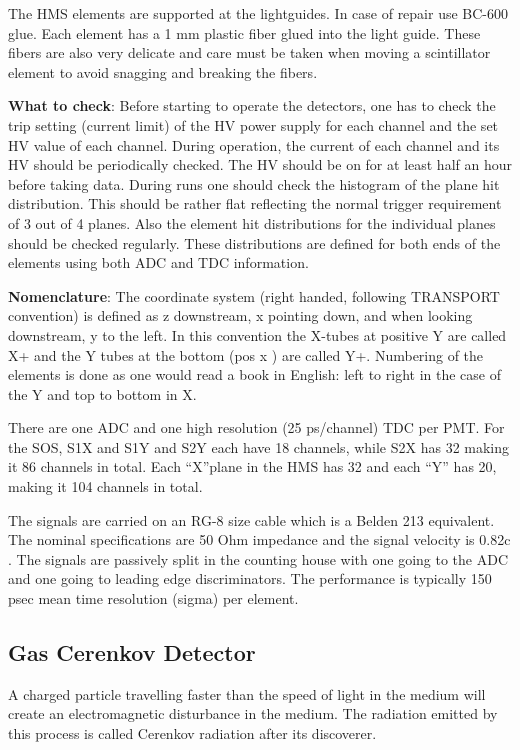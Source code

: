 {The HMS elements are supported at the lightguides. In case of repair use BC-600
glue. Each element has a 1 mm plastic fiber glued into the light guide. These
fibers are also very delicate and care must be taken when moving a scintillator
element to avoid snagging and breaking the fibers.

{\bf What to check}: Before starting to operate the detectors, one has to
check the trip setting (current limit) of the HV power supply for each channel
and the set HV value of each channel. During operation, the current of each
channel and its HV should be periodically checked. The HV should be on for at
least half an hour before taking data. During runs one should check the
histogram of the plane hit distribution. This should be rather flat reflecting
the normal trigger requirement of 3 out of 4 planes. Also the element hit
distributions for the individual planes should be checked regularly. These
distributions are defined for both ends of the elements using both ADC and TDC
information.

{\bf Nomenclature}:
The coordinate system (right handed, following TRANSPORT
convention) is defined as z downstream, x pointing down, and when looking
downstream, y to the left. In this convention the X-tubes at positive Y are
called X+ and the Y tubes at the bottom (pos x ) are called Y+. Numbering of
the elements is done as one would read a book in English: left to right in the
case of the Y and top to bottom in X.

	There are one ADC and one high resolution (25 ps/channel) TDC per PMT.
For the SOS, S1X and S1Y and S2Y each have 18 channels, while S2X has 32 making
it 86 channels in total. Each ``X''plane in the HMS has 32 and each
``Y'' has 20, making it 104 channels in total.

	The signals are carried on an RG-8 size cable which is a Belden 213
equivalent. The nominal specifications are 50 Ohm impedance and the signal
velocity is 0.82c . The signals are passively split in the counting house with
one going to the ADC and one going to leading edge discriminators. The
performance is typically 150 psec mean time resolution (sigma) per
element.

\subsection{Gas Cerenkov Detector}

A charged particle travelling faster
than the speed of light in the medium will create an electromagnetic
disturbance in the medium. The radiation emitted by this process is
called Cerenkov radiation after its discoverer.

}
